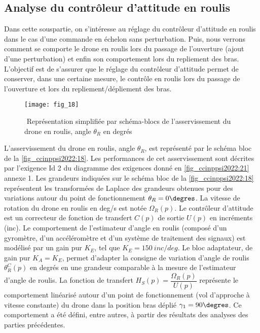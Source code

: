 \subsection{Analyse du contrôleur d’attitude en roulis}

Dans cette sous­partie, on s’intéresse au réglage du contrôleur d’attitude en roulis dans le
cas d’une commande en échelon sans perturbation. Puis, nous verrons comment se comporte le drone en roulis lors du passage de l’ouverture (ajout d’une perturbation) et enfin
son comportement lors du repliement des bras. L’objectif est de s’assurer que le réglage du
contrôleur d’attitude permet de conserver, dans une certaine mesure, le contrôle en roulis
lors du passage de l’ouverture et lors du repliement/dépliement des bras.

\begin{figure}[H]
\centering
\texttt{[image: fig\_18]}
\caption{\label{fig_ccinppsi2022:18} ­ Représentation simplifiée par schéma-blocs de l’asservissement du drone en
roulis, angle $\theta_R$ en degrés}
\end{figure}

L’asservissement du drone en roulis, angle $\theta_R$, est représenté par le schéma bloc de la
\autoref{fig_ccinppsi2022:18}. Les performances de cet asservissement sont décrites par l’exigence Id 2 du
diagramme des exigences donné en \autoref{fig_ccinppsi2022:21} annexe 1. Les grandeurs indiquées sur le
schéma bloc de la \autoref{fig_ccinppsi2022:18} représentent les transformées de Laplace des grandeurs obtenues pour des variations autour du point de fonctionnement $\theta_R = 0\degres$. La vitesse de rotation du
drone en roulis en \si{deg/s} est notée $\Omega_R(p)$. Le contrôleur d’attitude est un correcteur de fonction de transfert $C(p)$ de sortie $U(p)$ en incréments (inc). Le comportement de l’estimateur
d’angle en roulis (composé d’un gyromètre, d’un accéléromètre et d’un système de traitement des signaux) est modélisé par un gain pur $K_E$, tel que $K_E = \SI{150}{inc/deg}$.
Le bloc adaptateur, de gain pur $K_A = K_E$, permet d’adapter la consigne de variation d’angle
de roulis $\theta_R^C(p)$ en degrés en une grandeur comparable à la mesure de l’estimateur d’angle
de roulis.
La fonction de transfert $H_S (p) = \dfrac{\Omega_R(p)}{U(p)}$ représente le comportement linéarisé autour d’un
point de fonctionnement (vol d’approche à vitesse constante) du drone dans la position bras
déplié $\gamma_1 = 90\degres$. Ce comportement a été défini, entre autres, à partir des résultats des analyses des parties précédentes.


